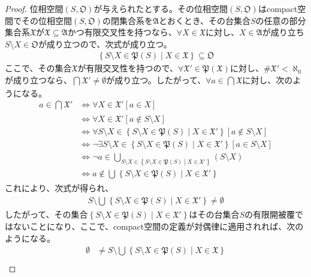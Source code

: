 \documentclass[dvipdfmx]{jsarticle}
\begin{document}
\begin{proof}
位相空間$\left( S,\mathfrak{O} \right)$が与えられたとする。その位相空間$\left( S,\mathfrak{O} \right)$はcompact空間でその位相空間$\left( S,\mathfrak{O} \right)$の閉集合系を$\mathfrak{A}$とおくとき、その台集合$S$の任意の部分集合系$\mathfrak{X}$が$\mathfrak{X \subseteq A}$かつ有限交叉性を持つなら、$\forall X \in \mathfrak{X}$に対し、$X \in \mathfrak{A}$が成り立ち$S \setminus X \in \mathfrak{O}$が成り立つので、次式が成り立つ。
\begin{align*}
\left\{ S \setminus X \in \mathfrak{P}(S) \middle| X\in \mathfrak{X} \right\}\subseteq \mathfrak{O}
\end{align*}
ここで、その集合$\mathfrak{X}$が有限交叉性を持つので、$\forall\mathfrak{X}'\in \mathfrak{P}\left( \mathfrak{X} \right)$に対し、${\#}\mathfrak{X}' < \aleph_{0}$が成り立つなら、$\bigcap_{} \mathfrak{X}' \neq \emptyset$が成り立つ。したがって、$\forall a \in \bigcap_{} \mathfrak{X}$に対し、次のようになる。
\begin{align*}
a \in \bigcap_{} \mathfrak{X}' &\Leftrightarrow \forall X \in \mathfrak{X}'[ a \in X]\\
&\Leftrightarrow \forall X \in \mathfrak{X}'[ a \notin S \setminus X]\\
&\Leftrightarrow \forall S \setminus X \in \left\{ S \setminus X \in \mathfrak{P}(S) \middle| X \in \mathfrak{X}' \right\}[ a \notin S \setminus X]\\
&\Leftrightarrow \neg\exists S \setminus X \in \left\{ S \setminus X \in \mathfrak{P}(S) \middle| X \in \mathfrak{X}' \right\}[ a \in S \setminus X]\\
&\Leftrightarrow \neg a \in \bigcup_{S \setminus X \in \left\{ S \setminus X \in \mathfrak{P}(S) \middle| X \in \mathfrak{X}' \right\}} (S \setminus X)\\
&\Leftrightarrow a \notin \bigcup_{} \left\{ S \setminus X \in \mathfrak{P}(S) \middle| X \in \mathfrak{X}' \right\}
\end{align*}
これにより、次式が得られ、
\begin{align*}
S \setminus \bigcup_{} \left\{ S \setminus X \in \mathfrak{P}(S) \middle| X \in \mathfrak{X}' \right\} \neq \emptyset
\end{align*}
したがって、その集合$\left\{ S \setminus X \in \mathfrak{P}(S) \middle| X \in \mathfrak{X}' \right\}$はその台集合$S$の有限開被覆ではないことになり、ここで、compact空間の定義が対偶律に適用されれば、次のようになる。
\begin{align*}
\emptyset &\neq S \setminus \bigcup_{} \left\{ S \setminus X \in \mathfrak{P}(S) \middle| X\in \mathfrak{X} \right\}\\

\end{align*}
\end{proof}
\end{document}

